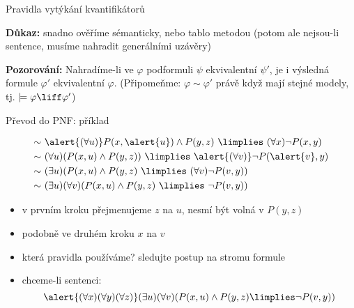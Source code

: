 \documentclass{beamer}
\begin{document}
\begin{frame}{Pravidla vytýkání kvantifikátorů}

    \pause

    \pause
    \textbf{Důkaz:} snadno ověříme sémanticky, nebo tablo metodou (potom ale nejsou-li sentence, musíme nahradit generálními uzávěry)\hfill\qedsymbol

    \smallskip

    \pause
    \textbf{Pozorování:} Nahradíme-li ve $\varphi$ podformuli $\psi$ ekvivalentní $\psi'$, je i výsledná formule $\varphi'$ ekvivalentní $\varphi$. (Připomeňme: $\varphi\sim\varphi'$ právě když mají stejné modely, tj. $\models\varphi\liff\varphi'$)
    
\end{frame}


\begin{frame}{Převod do PNF: příklad}

    \pause
    \begin{align*}
        \sim &\ 
        \alert{(\forall u)} P(x,\alert{u})\land P(y,z)\ \limplies\ (\forall x)\neg P(x,y)\\ \sim &\ 
        (\forall u)(P(x,u)\land P(y,z))\ \limplies\ \alert{(\forall v)}\neg P(\alert{v},y)\\ \sim &\ 
        (\exists u)( P(x,u)\land P(y,z)\ \limplies\ (\forall v)\neg P(v,y))\\ \sim &\ 
        (\exists u)(\forall v)( P(x,u)\land P(y,z)\ \limplies\ \neg P(v,y))
    \end{align*}
    
    \pause
    \begin{itemize}[<+->]
        \item v prvním kroku přejmenujeme $z$ na $u$, \alert{nesmí být volná v $P(y,z)$}
        \item podobně ve druhém kroku $x$ na $v$
        \item která pravidla používáme? sledujte postup na stromu formule
        \item chceme-li sentenci:
        $$
        \alert{(\forall x)(\forall y)(\forall z)}(\exists u)(\forall v)( P(x,u)\land P(y,z)\limplies\neg P(v,y))
        $$
    \end{itemize}

\end{frame}
\end{document}
